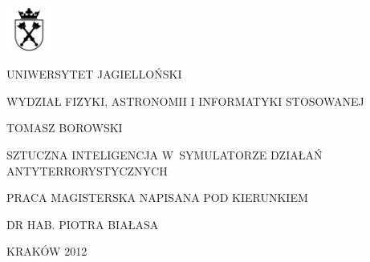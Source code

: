 \begin{center}
\thispagestyle{empty} %
\includegraphics[width=1.5cm, height=1.5cm]{logo_uj.png} %

{\large UNIWERSYTET JAGIELLOŃSKI

WYDZIAŁ FIZYKI, ASTRONOMII I INFORMATYKI STOSOWANEJ} \vfill\vfill\vfill\vfill

{\large TOMASZ BOROWSKI \bigskip}

{\Huge SZTUCZNA INTELIGENCJA
W~SYMULATORZE DZIAŁAŃ
ANTYTERRORYSTYCZNYCH}\bigskip\bigskip

{\large PRACA MAGISTERSKA NAPISANA POD KIERUNKIEM

DR HAB. PIOTRA BIAŁASA \vfill\vfill\vfill

KRAKÓW 2012} 
\end{center}
